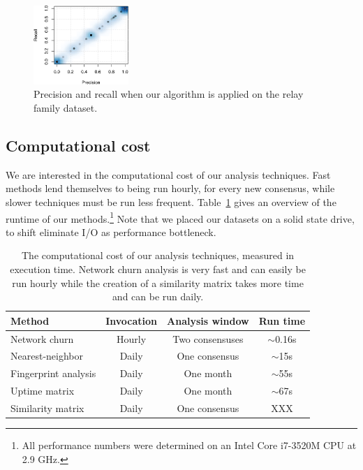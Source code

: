 \begin{figure}[t]
	\centering
	\includegraphics[width=0.32\textwidth]{diagrams/precision-recall.pdf}
	\caption{Precision and recall when our algorithm is applied on the relay
		family dataset.}
	\label{fig:precision-recall}
\end{figure}


\subsection{Computational cost}
\label{sec:performance}
We are interested in the computational cost of our analysis techniques.  Fast
methods lend themselves to being run hourly, for every new consensus, while
slower techniques must be run less frequent.  Table~\ref{tab:exp-deployment}
gives an overview of the runtime of our methods.\footnote{All performance
numbers were determined on an Intel Core i7-3520M CPU at 2.9 GHz.}  Note that we
placed our datasets on a solid state drive, to shift eliminate I/O as
performance bottleneck.

\begin{table}[t]
	\centering
	\begin{tabular}{lccc}
	\textbf{Method} & \textbf{Invocation} & \textbf{Analysis window} & \textbf{Run time} \\
	\hline
	Network churn & Hourly & Two consensuses & $\sim$0.16s \\
	Nearest-neighbor & Daily & One consensus & $\sim$15s \\
	Fingerprint analysis & Daily & One month & $\sim$55s \\
	Uptime matrix & Daily & One month & $\sim$67s \\
	Similarity matrix & Daily & One consensus & XXX \\
	\end{tabular}
	\caption{The computational cost of our analysis techniques, measured in
	execution time.  Network churn analysis is very fast and can easily be run
	hourly while the creation of a similarity matrix takes more time and can be
	run daily.}
	\label{tab:exp-deployment}
\end{table}

